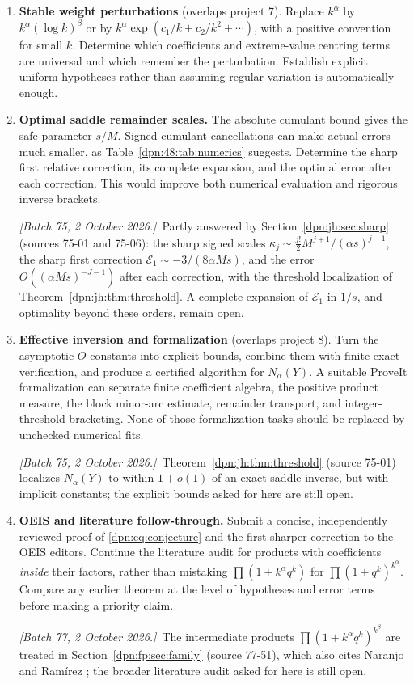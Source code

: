 \documentclass[11pt]{article}
\numberwithin{equation}{section}
\theoremstyle{definition}\newtheorem{definition}[theorem]{Definition}
\theoremstyle{remark}\newtheorem{remark}[theorem]{Remark}
\newcommand{\src}[1]{\textup{(source #1)}}
\newcommand{\writenote}[1]{\par\smallskip\noindent\textit{[Batch 75, 2 October 2026.]}\ #1\par\smallskip}
\newcommand{\writenotec}[1]{\par\smallskip\noindent\textit{[Batch 77, 2 October 2026.]}\ #1\par\smallskip}
\begin{document}
\begin{enumerate}[label=\textbf{48.\arabic*}, leftmargin=*]
Upgrade Corollary~\ref{dpn:48:thm:gumbel} to joint laws of the largest several
parts and convergence of the rescaled tail point process.  Prove quantitative
error bounds, uniform tail estimates, and asymptotics of the expectation and
variance of the largest part.  Distributional convergence alone does not
justify taking expectations.
\item \textbf{Stable weight perturbations} (overlaps project 7).
Replace $k^\alpha$ by $k^\alpha(\log k)^\beta$ or by
$k^\alpha\exp(c_1/k+c_2/k^2+\cdots)$, with a positive convention for small
$k$.  Determine which coefficients and extreme-value centring terms are
universal and which remember the perturbation.  Establish explicit uniform
hypotheses rather than assuming regular variation is automatically enough.
\item \textbf{Optimal saddle remainder scales.}
The absolute cumulant bound gives the safe parameter $s/M$.  Signed cumulant
cancellations can make actual errors much smaller, as
Table~\ref{dpn:48:tab:numerics} suggests.  Determine the sharp first relative
correction, its complete expansion, and the optimal error after each
correction.  This would improve both numerical evaluation and rigorous
inverse brackets.
\writenote{Partly answered by Section~\ref{dpn:jh:sec:sharp}
(sources 75-01 and 75-06): the sharp signed scales
$\kappa_j\sim\frac{j!}2M^{j+1}/(\alpha s)^{j-1}$, the sharp first correction
$\mathcal E_1\sim-3/(8\alpha Ms)$, and the error $O((\alpha Ms)^{-J-1})$ after
each correction, with the threshold localization of
Theorem~\ref{dpn:jh:thm:threshold}.  A complete expansion of $\mathcal E_1$ in
$1/s$, and optimality beyond these orders, remain open.}
\item \textbf{Effective inversion and formalization} (overlaps project 8).
Turn the asymptotic $O$ constants into explicit bounds, combine them with
finite exact verification, and produce a certified algorithm for
$N_\alpha(Y)$.  A suitable ProveIt formalization can separate finite
coefficient algebra, the positive product measure, the block minor-arc
estimate, remainder transport, and integer-threshold bracketing.  None of
those formalization tasks should be replaced by unchecked numerical fits.
\writenote{Theorem~\ref{dpn:jh:thm:threshold} \src{75-01} localizes
$N_\alpha(Y)$ to within $1+o(1)$ of an exact-saddle inverse, but with implicit
constants; the explicit bounds asked for here are still open.}
\item \textbf{OEIS and literature follow-through.}
Submit a concise, independently reviewed proof of \eqref{dpn:eq:conjecture}
and the first sharper correction to the OEIS editors.  Continue the
literature audit for products with coefficients \emph{inside} their factors,
rather than mistaking $\prod(1+k^\alpha q^k)$ for $\prod(1+q^k)^{k^\alpha}$.
Compare any earlier theorem at the level of hypotheses and error terms before
making a priority claim.
\writenotec{The intermediate products $\prod(1+k^\alpha q^k)^{k^\beta}$ are
treated in Section~\ref{dpn:fp:sec:family} (source 77-51), which also cites
Naranjo and Ram\'irez \cite{NR}; the broader literature audit asked for here
is still open.}
\end{enumerate}
\end{document}
